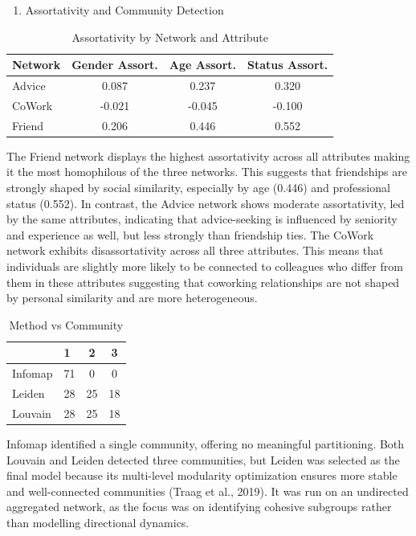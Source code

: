 \documentclass[
]{article}
\providecommand{\tightlist}{%
  \setlength{\itemsep}{0pt}\setlength{\parskip}{0pt}}
\begin{document}
\begin{enumerate}
\def\labelenumi{\arabic{enumi}.}
\setcounter{enumi}{1}
\tightlist
\item
  Assortativity and Community Detection
\end{enumerate}

\begin{longtable}[t]{lccc}
\caption{\label{tab:assortativity}Assortativity by Network and Attribute}\\
\toprule
Network & Gender Assort. & Age Assort. & Status Assort.\\
\midrule
Advice & 0.087 & 0.237 & 0.320\\
CoWork & -0.021 & -0.045 & -0.100\\
Friend & 0.206 & 0.446 & 0.552\\
\bottomrule
\end{longtable}

The Friend network displays the highest assortativity across all
attributes making it the most homophilous of the three networks. This
suggests that friendships are strongly shaped by social similarity,
especially by age (0.446) and professional status (0.552). In contrast,
the Advice network shows moderate assortativity, led by the same
attributes, indicating that advice-seeking is influenced by seniority
and experience as well, but less strongly than friendship ties. The
CoWork network exhibits disassortativity across all three attributes.
This means that individuals are slightly more likely to be connected to
colleagues who differ from them in these attributes suggesting that
coworking relationships are not shaped by personal similarity and are
more heterogeneous.

\begin{longtable}[t]{llcc}
\caption{\label{tab:leiden-community-detection}Method vs Community}\\
\toprule
 & 1 & 2 & 3\\
\midrule
Infomap & 71 & 0 & 0\\
Leiden & 28 & 25 & 18\\
Louvain & 28 & 25 & 18\\
\bottomrule
\end{longtable}

Infomap identified a single community, offering no meaningful
partitioning. Both Louvain and Leiden detected three communities, but
Leiden was selected as the final model because its multi-level
modularity optimization ensures more stable and well-connected
communities (Traag et al., 2019). It was run on an undirected aggregated
network, as the focus was on identifying cohesive subgroups rather than
modelling directional dynamics.
\end{document}
